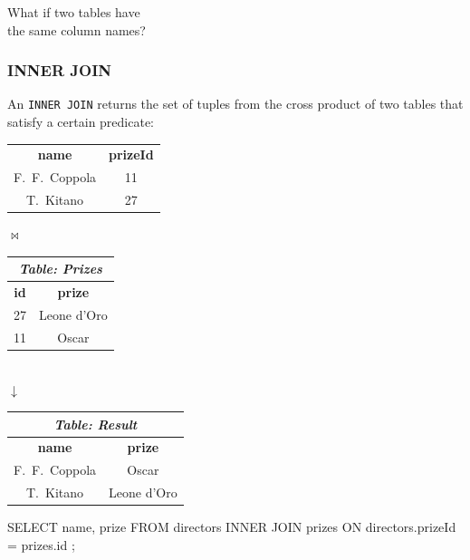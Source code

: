 \documentclass[english,serif,mathserif]{beamer}
\begin{document}
\begin{frame}
  \begin{center}
    \Large What if two tables have \\ the same column names?
  \end{center}
\end{frame}


\begin{frame}[fragile]
  \frametitle{INNER JOIN}

  An \texttt{INNER JOIN} returns the set of tuples from the cross product of two
  tables that satisfy a certain predicate:

  \begin{center}
    \begin{tabular}{cc}
      \rowcolor{white}\multicolumn{2}{c}{\em Table: Directors}
      \\
      \hline
      \textbf{name} & \textbf{prizeId}
      \\
      \hline
      F.~F.~Coppola & 11
      \\
      T.~Kitano & 27
    \end{tabular}
    {\color{gray}$\pmb\Join$}
    \begin{tabular}{cc}
      \multicolumn{2}{c}{\em Table: Prizes}
      \\
      \hline
      \textbf{id} & \textbf{prize}
      \\
      \hline
      27 & Leone d'Oro
      \\
      11 & Oscar
    \end{tabular}
    \\
    {\color{gray}$\pmb\downarrow$}
    \\
    \begin{tabular}{cc}
      \multicolumn{2}{c}{\em Table: Result}
      \\
      \hline
      \textbf{name} & \textbf{prize}
      \\
      \hline
      F.~F.~Coppola & Oscar
      \\
      T.~Kitano & Leone d'Oro
      \\
    \end{tabular}

    \+
    \begin{minipage}{32ex}
    \begin{sql}
SELECT name, prize
FROM directors INNER JOIN prizes
ON directors.prizeId = prizes.id ;
    \end{sql}
  \end{minipage}
  \end{center}
\end{frame}
\end{document}
